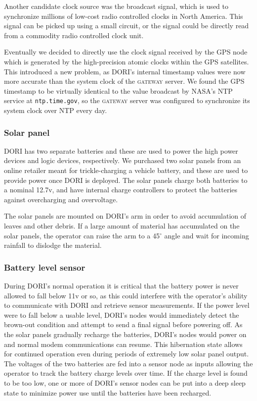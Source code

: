     Another candidate clock source was the  broadcast signal, which is used to synchronize millions of low-cost radio controlled clocks in North America. This signal can be picked up using a small circuit, or the signal could be directly read from a commodity radio controlled clock unit.

    Eventually we decided to directly use the clock signal received by the GPS node which is generated by the high-precision atomic clocks within the GPS satellites. This introduced a new problem, as DORI's internal timestamp values were now more accurate than the system clock of the \textsc{gateway} server. We found the GPS timestamp to be virtually identical to the value broadcast by NASA's NTP service at \texttt{ntp.time.gov}, so the \textsc{gateway} server was configured to synchronize its system clock over NTP every day.

    \subsubsection*{Solar panel}
    DORI has two separate batteries and these are used to power the high power devices and logic devices, respectively. We purchased two solar panels from an online retailer meant for trickle-charging a vehicle battery, and these are used to provide power once DORI is deployed. The solar panels charge both batteries to a nominal 12.7v, and have internal charge controllers to protect the batteries against overcharging and overvoltage.

    The solar panels are mounted on DORI's arm in order to avoid accumulation of leaves and other debris. If a large amount of material has accumulated on the solar panels, the operator can raise the arm to a 45$^{\circ}$ angle and wait for incoming rainfall to dislodge the material.

    \subsubsection*{Battery level sensor}
    During DORI's normal operation it is critical that the battery power is never allowed to fall below 11v or so, as this could interfere with the operator's ability to communicate with DORI and retrieve sensor measurements. If the power level were to fall below a usable level, DORI's nodes would immediately detect the brown-out condition and attempt to send a final signal before powering off. As the solar panels gradually recharge the batteries,  DORI's nodes would power on and normal modem communications can resume. This hibernation state allows for continued operation even during periods of extremely low solar panel output. The voltages of the two batteries are fed into a sensor node as inputs allowing the operator to track the battery charge levels over time. If the charge level is found to be too low, one or more of DORI's sensor nodes can be put into a deep sleep state to minimize power use until the batteries have been recharged.

